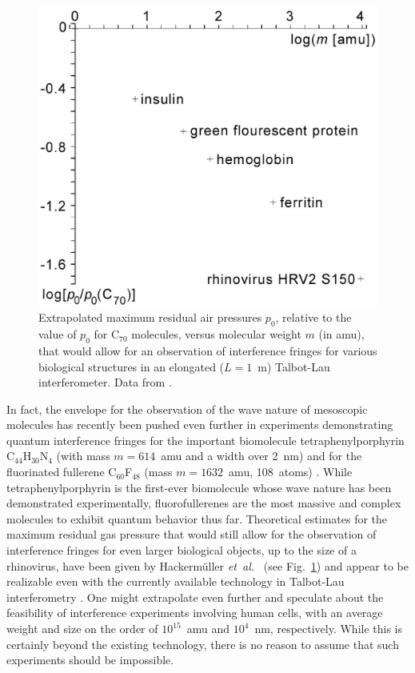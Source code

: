 \documentclass[12pt,aps,floatfix,amsmath,amssymb,showpacs,nofootinbib]{revtex4-2}
\newcommand{\etal}{\emph{et~al.\ }}
\begin{document}
\begin{figure}
\begin{center}
  \includegraphics[scale=.35]{extrapol-n.eps}
\end{center}
\caption[Extrapolated maximum residual air pressures for 
interference experiments with various
biomolecules]{\label{fig:extrapol}Extrapolated maximum residual air
  pressures $p_0$, relative to the value of $p_0$ for C$_{70}$
  molecules, versus molecular weight $m$ (in amu), that would allow
  for an observation of interference fringes for various biological
  structures in an elongated ($L = 1$~m) Talbot-Lau interferometer.
  Data from \cite{Hackermuller:2003:uu}.  }
\end{figure}

In fact, the envelope for the observation of the wave nature of
mesoscopic molecules has recently been pushed even further in
experiments demonstrating quantum interference fringes for the
important biomolecule tetraphenylporphyrin C$_{44}$H$_{30}$N$_4$ (with
mass $m = 614$~amu and a width over 2~nm) and for the fluorinated
fullerene C$_{60}$F$_{48}$ (mass $m = 1632$~amu, 108~atoms)
\cite{Hackermueller:2002:wb}. While tetraphenylporphyrin is the
first-ever biomolecule whose wave nature has been demonstrated
experimentally, fluorofullerenes are the most massive and complex
molecules to exhibit quantum behavior thus far. Theoretical estimates
for the maximum residual gas pressure that would still allow for the
observation of interference fringes for even larger biological
objects, up to the size of a rhinovirus, have been given by
Hackerm\"uller \etal \cite{Arndt:2002:bo,Hackermuller:2003:uu} (see
Fig.~\ref{fig:extrapol}) and appear to be realizable even with the
currently available technology in Talbot-Lau interferometry
\cite{Hornberger:2003:tv,Hackermuller:2003:uu}. One might extrapolate
even further and speculate about the feasibility of interference
experiments involving human cells, with an average weight and size on
the order of $10^{15}$~amu and $10^4$~nm, respectively.  While this is
certainly beyond the existing technology, there is no reason to assume
that such experiments should be impossible.
\end{document}
